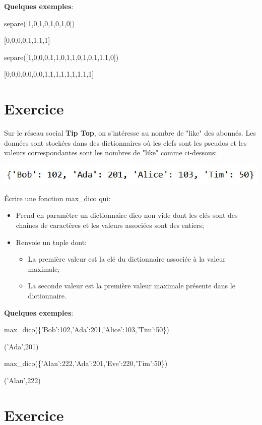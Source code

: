 \documentclass[11pt,a4paper]{article}
\newcounter{num}
\begin{document}
\textbf{Quelques exemples}:

\textsf{separe([1,0,1,0,1,0,1,0])}

\textsf{[0,0,0,0,1,1,1,1]}

\textsf{separe([1,0,0,0,1,1,0,1,1,0,1,0,1,1,1,0])}

\textsf{[0,0,0,0,0,0,0,1,1,1,1,1,1,1,1,1]}


\section*{Exercice \thenum}

Sur le réseau social \textbf{Tip Top}, on s'intéresse au nombre de "like" des abonnés. Les données sont stockées dans des dictionnaires où les clefs sont les pseudos et les valeurs correspondantes sont les nombres de "like" comme ci-dessous:

\begin{center}
\includegraphics[scale=0.8]{../img/dico_like.eps}
\end{center}

Écrire une fonction \textsf{max\_dico} qui:
\begin{itemize}
\item Prend en paramètre un dictionnaire \textsf{dico} non vide dont les clés sont des chaines de caractères et les valeurs associées sont des entiers;
\item Renvoie un tuple dont:
\begin{itemize}
\item La première valeur est la clé du dictionnaire associée à la valeur maximale;
\item La seconde valeur est la première valeur maximale présente dans le dictionnaire.
\end{itemize}
\end{itemize}

\textbf{Quelques exemples}:

\textsf{max\_dico(\{'Bob':102,'Ada':201,'Alice':103,'Tim':50\})}

\textsf{('Ada',201)}

\textsf{max\_dico(\{'Alan':222,'Ada':201,'Eve':220,'Tim':50\})}

\textsf{('Alan',222)}


\section*{Exercice \thenum}
\end{document}
